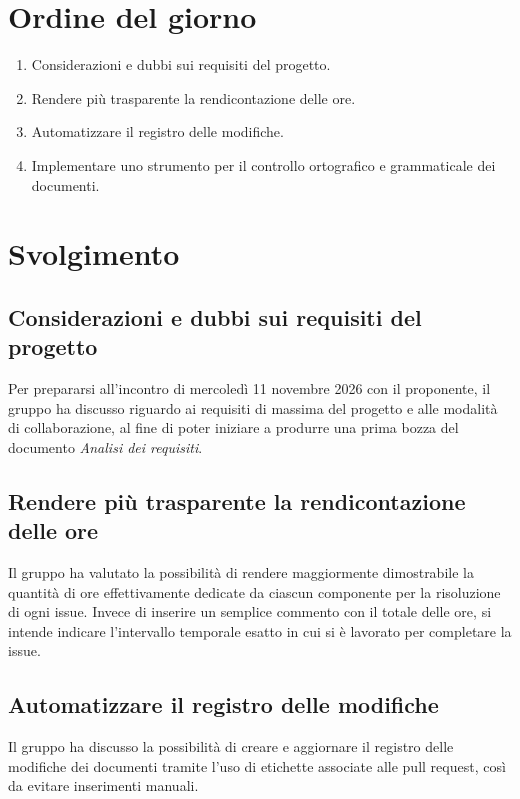 \documentclass[interno]{gpt}
\begin{document}
\section{Ordine del giorno}
\begin{enumerate}
  \item Considerazioni e dubbi sui requisiti del progetto.
  \item Rendere più trasparente la rendicontazione delle ore.
  \item Automatizzare il registro delle modifiche.
  \item Implementare uno strumento per il controllo ortografico e grammaticale dei documenti.
\end{enumerate}

\clearpage

\section{Svolgimento}

\subsection{Considerazioni e dubbi sui requisiti del progetto}
Per prepararsi all'incontro di mercoledì 11 novembre 2026 con il proponente, il gruppo ha discusso riguardo ai requisiti di massima del progetto e alle modalità di collaborazione, al fine di poter iniziare a produrre una prima bozza del documento \textit{Analisi dei requisiti}.

\subsection{Rendere più trasparente la rendicontazione delle ore}
Il gruppo ha valutato la possibilità di rendere maggiormente dimostrabile la quantità di ore effettivamente dedicate da ciascun componente per la risoluzione di ogni issue. Invece di inserire un semplice commento con il totale delle ore, si intende indicare l'intervallo temporale esatto in cui si è lavorato per completare la issue.

\subsection{Automatizzare il registro delle modifiche}
Il gruppo ha discusso la possibilità di creare e aggiornare il registro delle modifiche dei documenti tramite l'uso di etichette associate alle pull request, così da evitare inserimenti manuali.
\end{document}

